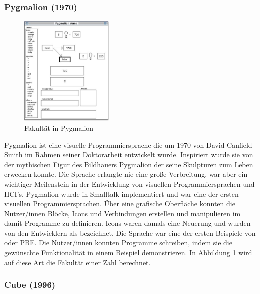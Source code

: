 \documentclass[ngerman]{article}
\begin{document}
\subsubsection{Pygmalion (1970)}
\begingroup
\setlength\intextsep{2pt}
\begin{minipage}{\linewidth}
\begin{figure}
  \centering
  \includegraphics[width=0.4\textwidth]{./graphics/pygmalion.jpg}
  \caption{Fakultät in Pygmalion \cite{smith1975pygmalion}}
  \label{fig:pygmalion_demo}
\end{figure}

Pygmalion ist eine visuelle Programmiersprache die um 1970 von David Canfield Smith im Rahmen seiner Doktorarbeit entwickelt wurde. Inspiriert wurde sie von der mythischen Figur des Bildhauers Pygmalion der seine Skulpturen zum Leben erwecken konnte.
Die Sprache erlangte nie eine große Verbreitung, war aber ein wichtiger Meilenstein in der Entwicklung von visuellen Programmiersprachen und HCI's.
Pygmalion wurde in Smalltalk implementiert und war eine der ersten visuellen Programmiersprachen. Über eine grafische Oberfläche konnten die Nutzer/innen Blöcke, Icons und Verbindungen erstellen und manipulieren im damit Programme zu definieren.
  Icons waren damals eine Neuerung und wurden von den Entwicklern als  bezeichnet. 
  Die Sprache war eine der ersten Beispiele von  oder PBE.
Die Nutzer/innen konnten Programme schreiben, indem sie die gewünschte Funktionalität in einem Beispiel demonstrieren. 
In Abbildung \ref{fig:pygmalion_demo} wird auf diese Art die Fakultät einer Zahl berechnet. 

\end{minipage}
\endgroup

\subsubsection{Cube (1996)}
\end{document}
